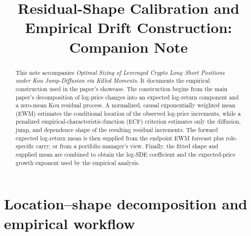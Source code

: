 \documentclass[11pt]{article}
\title{Residual-Shape Calibration and Empirical Drift Construction:\\Companion Note}
\author{}
\date{}
\begin{document}
\maketitle

\begin{abstract}
This note accompanies \emph{Optimal Sizing of Leveraged Crypto Long--Short Positions
under Kou Jump-Diffusion via Killed Moments}. It documents the empirical construction
used in the paper's showcase. The construction begins from the main paper's decomposition of
log-price changes into an expected log-return component and a zero-mean Kou residual process.
A normalized, causal exponentially weighted mean (EWM) estimates the conditional location of
the observed log-price increments, while a penalized empirical-characteristic-function (ECF)
criterion estimates only the diffusion, jump, and dependence shape of the resulting residual
increments. The forward expected log-return mean is then supplied from the endpoint EWM
forecast plus role-specific carry, or from a portfolio manager's view. Finally, the fitted
shape and supplied mean are combined to obtain the log-SDE coefficient and the expected-price
growth exponent used by the empirical analysis.
\end{abstract}

\section{Location--shape decomposition and empirical workflow}\label{sec:construction-overview}
\end{document}
